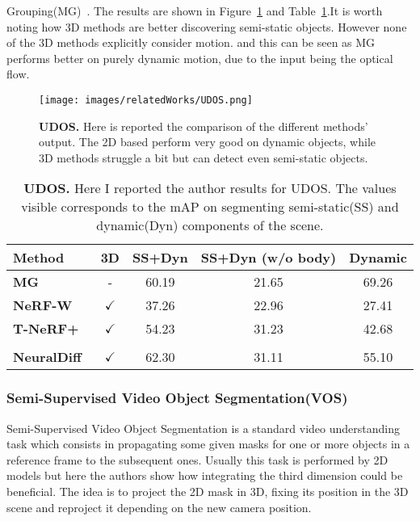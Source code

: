  Grouping(MG)~\cite{MG}. The results are shown in Figure~\ref{fig:UDOS} and Table~\ref{tab:UDOS}.It is worth noting how 3D methods are better discovering semi-static objects.
 However none of the 3D methods explicitly consider motion. and this can be seen as MG performs better on purely dynamic motion, due to the input being the optical flow.
\begin{figure}
    \centering
    \texttt{[image: images/relatedWorks/UDOS.png]} 
    \caption{\textbf{UDOS.} Here is reported the comparison of the different methods' output.
    The 2D based perform very good on dynamic objects, while 3D methods struggle a bit but can detect even semi-static objects.}\label{fig:UDOS}
\end{figure}
\begin{table}
    \begin{tabular}{lcccc}
        \hline \textbf{Method} & \textbf{3D} & \textbf{SS+Dyn} & \textbf{SS+Dyn (w/o body)} &\textbf{ Dynamic} \\
        \hline \textbf{MG} ~\cite{MG} & - & 60.19 & 21.65 & 69.26 \\
        \textbf{NeRF-W} ~\cite{nerfw} & $\checkmark$ & 37.26 & 22.96 & 27.41 \\
        \textbf{T-NeRF+}~\cite{Tnerf} & $\checkmark$ & 54.23 & 31.23 & 42.68 \\
        & & & & \\
        \textbf{NeuralDiff}~\cite{neuraldiff}& $\checkmark$ & 62.30 & 31.11 & 55.10 \\
        \hline
        \end{tabular}
        \caption{\textbf{UDOS.} Here I reported the author results for UDOS. The values visible corresponds to the mAP on segmenting semi-static(SS) 
        and dynamic(Dyn) components of the scene.}\label{tab:UDOS}
\end{table}

\subsubsection{Semi-Supervised Video Object Segmentation(VOS)}
Semi-Supervised Video Object Segmentation is a standard video understanding task which consists in propagating some given masks for one or more
objects in a reference frame to the subsequent ones. Usually this task is performed by 2D models but here the authors show how integrating the third dimension
could be beneficial. The idea is to project the 2D mask in 3D, fixing its position in the 3D scene and reproject it depending on the new camera position.

